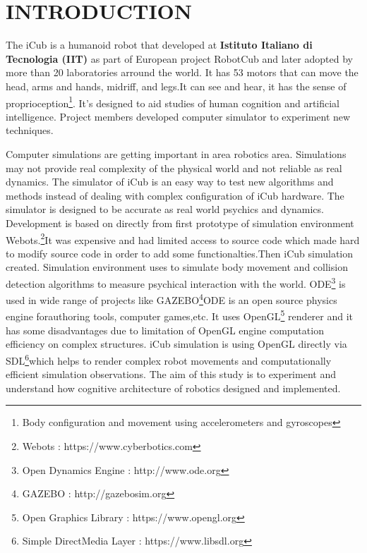\documentclass[a4paper, 12pt]{report}
\begin{document}
\chapter{INTRODUCTION}
The iCub is a humanoid robot that developed at \textbf{Istituto Italiano di 
Tecnologia (IIT)} as part of European project RobotCub and later adopted by 
more 
than 20 laboratories arround the world. It has 53 motors that can move the 
head, arms and hands, midriff, and legs.It can see and hear, it has the sense 
of proprioception\footnote{Body configuration and movement using accelerometers 
and gyroscopes}. It’s designed to aid studies of human cognition and artificial 
intelligence. Project members developed computer simulator to experiment new 
techniques.\par 
Computer simulations are getting important in area robotics area. Simulations 
may not provide real complexity of the physical world and 
not reliable as real dynamics. The simulator of iCub is an easy way to test 
new algorithms and methods instead of dealing with complex configuration of 
iCub hardware. The simulator is designed to be accurate as real world 
psychics and dynamics. Development is based on directly from first prototype 
of simulation environment Webots.\footnote{Webots : 
  https://www.cyberbotics.com}It was 
expensive and had limited access to source code which made hard to modify 
source code in order to add some functionalties.Then iCub simulation created. 
Simulation environment uses \linebreak to simulate body 
movement and collision detection algorithms to measure psychical interaction 
with the world. ODE\footnote{Open Dynamics Engine : http://www.ode.org} is 
used in wide range of projects like GAZEBO\footnote{GAZEBO : 
  http://gazebosim.org}ODE is an open source physics engine forauthoring 
  tools, 
computer games,etc. It uses OpenGL\footnote{Open Graphics Library : 
  https://www.opengl.org} renderer and it has some disadvantages due to 
limitation of OpenGL engine computation efficiency on complex structures. 
iCub 
simulation is using OpenGL directly via SDL\footnote{Simple DirectMedia Layer 
: 
  https://www.libsdl.org}which helps to render complex robot movements and 
computationally efficient simulation observations. The aim of this study is to 
experiment and understand how cognitive architecture of robotics designed and 
implemented. 
\end{document}
